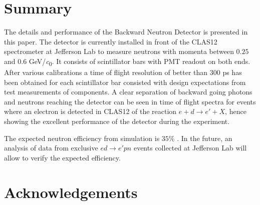 \documentclass[3p,final,twocolumn]{elsarticle}
\begin{document}
{%

\section{Summary}
The details and performance of the Backward Neutron Detector is presented in this paper. The detector is currently installed in front of the CLAS12 spectrometer at Jefferson Lab to measure neutrons with momenta between $0.25$ and $0.6$ \si{\GeV/\clight}.  It consists of scintillator bars with PMT readout on both ends.
After various calibrations a time of flight resolution of better than 300 \si{\pico\s} has been obtained for each scintillator bar consisted with design expectations from test measurements of components. A clear separation of backward going photons and neutrons reaching the detector can be seen in time of flight spectra for events where an electron is detected in CLAS12 of the reaction $e+d \rightarrow e'+X$, hence showing the excellent performance of the detector during the experiment.

The expected neutron efficiency from simulation is $35$\% . In the future, an analysis of data from exclusive $ed \rightarrow e'pn$ events collected at Jefferson Lab will allow to verify the expected efficiency.


\section{Acknowledgements}

\clearpage

}
\end{document}
